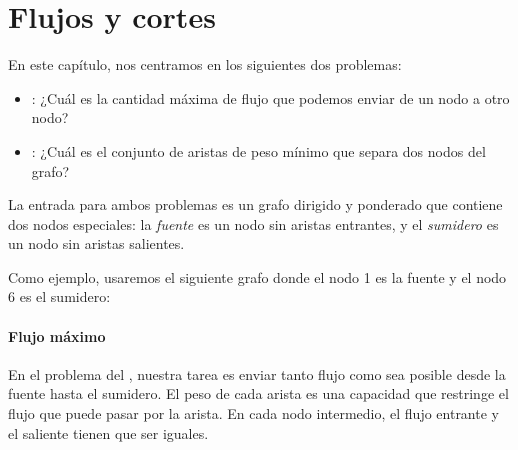 \chapter{Flujos y cortes}

En este capítulo, nos centramos en los siguientes
dos problemas:

\begin{itemize}
\item {}:
¿Cuál es la cantidad máxima de flujo que podemos
enviar de un nodo a otro nodo?
\item {}:
¿Cuál es el conjunto de aristas de peso mínimo
que separa dos nodos del grafo?
\end{itemize}

La entrada para ambos problemas es un grafo dirigido y
ponderado que contiene dos nodos especiales:
la \emph{fuente} es un nodo sin aristas entrantes,
y el \emph{sumidero} es un nodo sin aristas salientes.

Como ejemplo, usaremos el siguiente grafo
donde el nodo 1 es la fuente y el nodo 6
es el sumidero:

\begin{center}
\end{center}

\subsubsection{Flujo máximo}


En el problema del ,
nuestra tarea es enviar tanto flujo como sea posible
desde la fuente hasta el sumidero.
El peso de cada arista es una capacidad que
restringe el flujo
que puede pasar por la arista.
En cada nodo intermedio,
el flujo entrante y el saliente
tienen que ser iguales.

